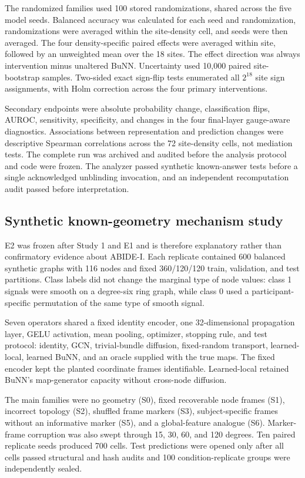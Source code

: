 \documentclass[11pt,a4paper]{article}
\begin{document}
The randomized families used 100 stored randomizations, shared across the
five model seeds. Balanced accuracy was calculated for each seed and
randomization, randomizations were averaged within the site-density cell,
and seeds were then averaged. The four density-specific paired effects were
averaged within site, followed by an unweighted mean over the 18 sites. The
effect direction was always intervention minus unaltered BuNN. Uncertainty
used 10,000 paired site-bootstrap samples. Two-sided exact sign-flip tests
enumerated all $2^{18}$ site sign assignments, with Holm correction across
the four primary interventions.

Secondary endpoints were absolute probability change, classification flips,
AUROC, sensitivity, specificity, and changes in the four final-layer
gauge-aware diagnostics. Associations between representation and prediction
changes were descriptive Spearman correlations across the 72 site-density
cells, not mediation tests. The complete run was archived and audited before
the analysis protocol and code were frozen. The analyzer passed synthetic
known-answer tests before a single acknowledged unblinding invocation, and
an independent recomputation audit passed before interpretation.

\subsection{Synthetic known-geometry mechanism study}

E2 was frozen after Study 1 and E1 and is therefore explanatory rather than
confirmatory evidence about ABIDE-I. Each replicate contained 600 balanced
synthetic graphs with 116 nodes and fixed 360/120/120 train, validation, and
test partitions. Class labels did not change the marginal type of node values:
class 1 signals were smooth on a degree-six ring graph, while class 0 used a
participant-specific permutation of the same type of smooth signal.

Seven operators shared a fixed identity encoder, one 32-dimensional
propagation layer, GELU activation, mean pooling, optimizer, stopping rule, and
test protocol: identity, GCN, trivial-bundle diffusion, fixed-random transport,
learned-local, learned BuNN, and an oracle supplied with the true maps. The
fixed encoder kept the planted coordinate frames identifiable. Learned-local
retained BuNN's map-generator capacity without cross-node diffusion.

The main families were no geometry (S0), fixed recoverable node frames (S1),
incorrect topology (S2), shuffled frame markers (S3), subject-specific frames
without an informative marker (S5), and a global-feature analogue (S6).
Marker-frame corruption was also swept through 15, 30, 60, and 120 degrees.
Ten paired replicate seeds produced 700 cells. Test predictions were opened
only after all cells passed structural and hash audits and 100
condition-replicate groups were independently sealed.
\end{document}
